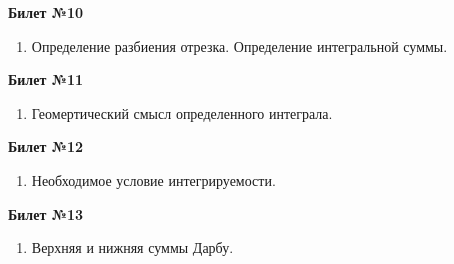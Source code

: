 \documentclass[a4paper, 12pt]{article}
\begin{document}
\begin{center}
	\textbf{Билет №10}
\end{center}
\begin{enumerate}
	\item Определение разбиения отрезка. Определение интегральной суммы.
\end{enumerate}

\begin{center}
	\textbf{Билет №11}
\end{center}
\begin{enumerate}
	\item Геомертический смысл определенного интеграла.
\end{enumerate}

\begin{center}
	\textbf{Билет №12}
\end{center}
\begin{enumerate}
	\item Необходимое условие интегрируемости.
\end{enumerate}

\begin{center}
	\textbf{Билет №13}
\end{center}
\begin{enumerate}
	\item Верхняя и нижняя суммы Дарбу.
\end{enumerate}
\end{document}
